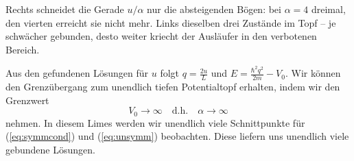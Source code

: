 

Rechts schneidet die Gerade $u/\alpha$ nur die absteigenden Bögen: bei $\alpha=4$ dreimal, den vierten erreicht sie nicht mehr. Links dieselben drei Zustände im Topf -- je schwächer gebunden, desto weiter kriecht der Ausläufer in den verbotenen Bereich.

Aus den gefundenen Lösungen für $u$ folgt $q = \frac{2u}{L}$ und $E = \frac{\hbar^2q^2}{2m}-V_0$. Wir können den Grenzübergang zum unendlich tiefen Potentialtopf erhalten, indem wir den Grenzwert
\begin{equation}
	V_0\rightarrow \infty\quad \text{d.h.} \quad \alpha\rightarrow\infty
\end{equation}
nehmen. In diesem Limes werden wir unendlich viele Schnittpunkte für (\ref{eq:symmcond}) und (\ref{eq:unsymm}) beobachten. Diese liefern uns unendlich viele gebundene Lösungen.

